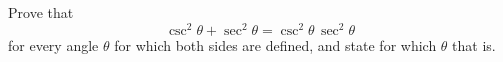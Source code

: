 Prove that
\[\csc^2\theta+\sec^2\theta=\csc^2\theta\,\sec^2\theta\]
for every angle $\theta$ for which both sides are defined, and state for which $\theta$ that is.
